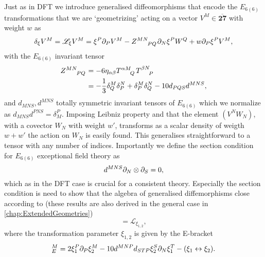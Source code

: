 Just as in DFT we introduce generalised diffeomorphisms that encode the $E_{6(6)}$ transformations that we are `geometrizing' acting on a vector $V^M\in\overbar{\mathbf{27}}$ with weight $w$ as 
\begin{equation}
    \delta_\xi V^M = \mathscr{L}_\xi V^M = \xi^P\pd_PV^M-\tensor{Z}{^{MN}_{PQ}}\pd_N\xi^P W^Q+w\pd_P\xi^PV^M,
\end{equation}
with the $E_{6(6)}$ invariant tensor
\begin{equation}
    \begin{aligned}
    \tensor{Z}{^{MN}_{PQ}} &= -6\eta_{\alpha\beta}\tensor{T}{^{\alpha M}_Q}\tensor{T}{^{\beta N}_P} \\
    &= -\frac{1}{3}\delta^M_Q\delta^N_P+\delta^M_P\delta^N_Q-10d_{PQS}d^{MNS},
    \end{aligned}
\end{equation}
and $d_{MNS},d^{MNS}$ totally symmetric invariant tensors of $E_{6(6)}$ which we normalize as $d_{MNS}d^{PNS}=\delta^P_M$. Imposing Leibniz property and that the element $(V^NW_N)$, with a covector $W_N$ with weight $w'$, transforms as a scalar density of weigth $w+w'$ the action on $W_N$ is easily found. This generalises straightforward to a tensor with any number of indices. Importantly we define the section condition for $E_{6(6)}$ exceptional field theory as 
\begin{equation}
    d^{MNS}\partial_N\otimes\partial_S = 0,
\end{equation}
which as in the DFT case is crucial for a consistent theory. Especially the section condition is need to show that the algebra of generalised diffemorphisms close according to \cite{E62014} (these results are also derived in the general case in \ref{chap:ExtendedGeometries})
\begin{equation}
    [\mathscr{L}_{\xi_1},\mathscr{L}_{\xi_2}] = \mathscr{L}_{\xi_{1,2}},
\end{equation}
where the transformation parameter $\xi_{1,2}$ is given by the E-bracket 
\begin{equation}
    [\xi_1,\xi_2]_E^M = 2\xi_1^P\pd_P\xi_2^M-10d^{MNP}d_{STP}\xi_2^S\pd_N\xi_1^T-(\xi_1\leftrightarrow\xi_2).
\end{equation}


